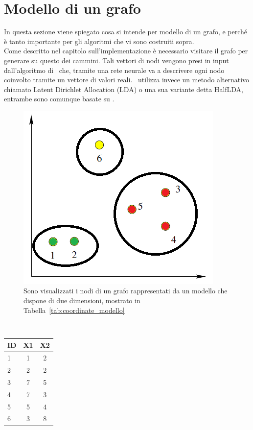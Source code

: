 \section{Modello di un grafo}
In questa sezione viene spiegato cosa si intende per modello di un grafo, e perché è tanto importante per gli algoritmi che vi sono costruiti sopra.\\
Come descritto nel capitolo sull'implementazione è necessario visitare il grafo per generare su questo dei cammini. Tali vettori di nodi vengono presi in input dall'algoritmo di \wv\ che, tramite una rete neurale va a descrivere ogni nodo coinvolto tramite un vettore di valori reali. \cnrl\ utilizza invece un metodo alternativo chiamato Latent Dirichlet Allocation (LDA)\cite{LDA} o una sua variante detta HalfLDA, entrambe sono comunque basate su \wv.\\
\begin{figure}[htp]
	\centering
	\includegraphics{immagini/punti_modello}
	\caption{Sono visualizzati i nodi di un grafo rappresentati da un modello che dispone di due dimensioni, mostrato in Tabella~\ref{tab:coordinate_modello}}
	\label{fig:grafico_modello}
\end{figure}
\\
\begin{center}
	\begin{tabular}{|l|cc|}
		\hline
		ID&X1&X2 \\
		\hline
		1 & 1 & 2 \\
		2 & 2 & 2 \\
		3 & 7 & 5 \\
		4 & 7 & 3 \\
		5 & 5 & 4 \\
		6 & 3 & 8 \\
		\hline
	\end{tabular}
	\label{tab:coordinate_modello}
\end{center}
